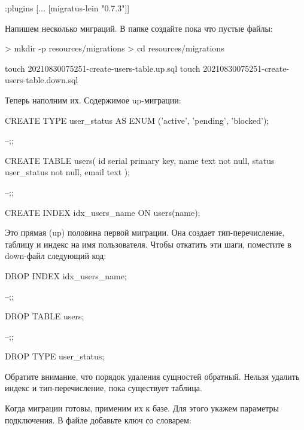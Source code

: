 \begin{english}
  \begin{clojure}
:plugins [... [migratus-lein "0.7.3"]]
  \end{clojure}
\end{english}

Напишем несколько миграций. В папке  создайте пока что пустые файлы:

\begin{english}
  \begin{bash}
> mkdir -p resources/migrations
> cd resources/migrations

touch 20210830075251-create-users-table.up.sql
touch 20210830075251-create-users-table.down.sql
  \end{bash}
\end{english}

Теперь наполним их. Содержимое up-миграции:

\begin{english}
  \begin{sql}
CREATE TYPE user_status AS ENUM
       ('active', 'pending', 'blocked');

--;;

CREATE TABLE users(
  id serial primary key,
  name text not null,
  status user_status not null,
  email text
);

--;;

CREATE INDEX idx_users_name ON users(name);
  \end{sql}
\end{english}

Это прямая (up) половина первой миграции. Она создает тип-перечисление, таблицу  и индекс на имя пользователя. Чтобы откатить эти шаги, поместите в down-файл следующий код:

\begin{english}
  \begin{sql}
DROP INDEX idx_users_name;

--;;

DROP TABLE users;

--;;

DROP TYPE user_status;
  \end{sql}
\end{english}

Обратите внимание, что порядок удаления сущностей обратный. Нельзя удалить индекс и тип-перечисление, пока существует таблица.

Когда миграции готовы, применим их к базе. Для этого укажем параметры подключения. В файле  добавьте ключ  со словарем:

